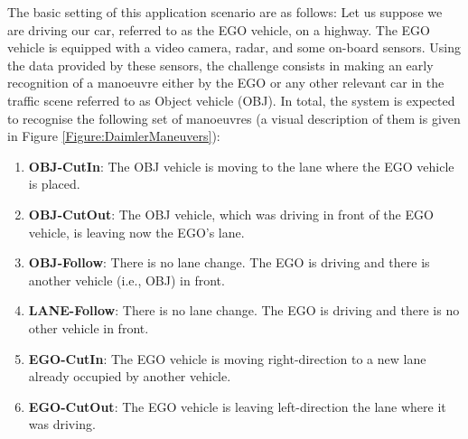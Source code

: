 The basic setting of this application scenario are as follows: Let us suppose we are driving our car, referred to as the EGO vehicle, on a highway. The EGO vehicle is equipped with a video camera, radar, and some on-board sensors. Using the data provided by these sensors, the challenge consists in making an early recognition of a manoeuvre either by the EGO or any other relevant car in the traffic scene referred to as Object vehicle (OBJ). In total, the system is expected to recognise the following set of manoeuvres (a visual description of them is given in Figure \ref{Figure:DaimlerManeuvers}):

\begin{enumerate}
\item \textbf{OBJ-CutIn}: The OBJ vehicle is moving to the lane where the EGO vehicle is placed.
\item \textbf{OBJ-CutOut}: The OBJ vehicle, which was driving in front of the EGO vehicle, is leaving now the EGO's lane.
\item \textbf{OBJ-Follow}: There is no lane change. The EGO is driving and there is another vehicle (i.e., OBJ) in front.
\item \textbf{LANE-Follow}: There is no lane change. The EGO is driving and there is no other vehicle in front.
\item \textbf{EGO-CutIn}: The EGO vehicle is moving right-direction to a new lane already occupied by another vehicle. 
\item \textbf{EGO-CutOut}: The EGO vehicle is leaving left-direction the lane where it was driving.
\end{enumerate}

